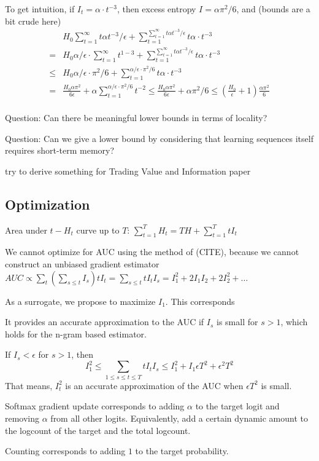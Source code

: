\documentclass[11pt,letterpaper]{article}
\begin{document}
To get intuition, if $I_t = \alpha \cdot t^{-3}$, then excess entropy $I=\alpha \pi^2/6$, and (bounds are a bit crude here)
\begin{align}
& H_0 \sum_{t=1}^\infty t \alpha t^{-3}/\epsilon + \sum_{t=1}^{\sum_{t=1}^\infty t \alpha t^{-3}/\epsilon} t \alpha \cdot t^{-3} \\
= & H_0 \alpha/\epsilon \cdot \sum_{t=1}^\infty  t^{1-3} + \sum_{t=1}^{\sum_{t=1}^\infty t \alpha t^{-3}/\epsilon} t \alpha \cdot t^{-3} \\
\leq & H_0 \alpha/\epsilon \cdot \pi^2/6 + \sum_{t=1}^{\alpha/\epsilon \cdot \pi^2/6} t \alpha \cdot t^{-3} \\
= & \frac{H_0 \alpha \pi^2}{6 \epsilon} + \alpha \sum_{t=1}^{\alpha/\epsilon \cdot \pi^2/6}  t^{-2} \leq  \frac{H_0 \alpha \pi^2}{6 \epsilon} + \alpha \pi^2/6  \leq  \left(\frac{H_0}{\epsilon} + 1\right) \frac{\alpha \pi^2}{6} \\
\end{align}


Question: Can there be meaningful lower bounds in terms of locality?

Question: Can we give a lower bound by considering that learning sequences itself requires short-term memory?

try to derive something for Trading Value and Information paper


\subsection{Optimization}
Area under $t - H_t$ curve up to $T$: $\sum_{t=1}^T H_t = T H + \sum_{t=1}^T t I_t$

We cannot optimize for AUC using the method of (CITE), because we cannot construct an unbiased gradient estimator
$AUC \propto \sum_{t} (\sum_{s \leq t} I_s) tI_t = \sum_{s \leq t}  tI_t I_s = I_1^2 + 2 I_1 I_2 + 2 I_2^2 + \dots$



As a surrogate, we propose to maximize $I_1$.
This corresponds

It provides an accurate approximation to the AUC if $I_s$ is small for $s > 1$, which holds for the n-gram based estimator.

If $I_s < \epsilon$ for $s > 1$, then 
\begin{equation}
	I_1^2 \leq \sum_{1\leq s \leq t \leq T}  tI_t I_s \leq I_1^2 + I_1 \epsilon T^2 + \epsilon^2 T^2
\end{equation}
That means, $I_t^2$ is an accurate approximation of the AUC when $\epsilon T^2$ is small.


Softmax gradient update corresponds to adding $\alpha$ to the target logit and removing $\alpha$ from all other logits.
Equivalently, add a certain dynamic amount to the logcount of the target and the total logcount.



Counting corresponds to adding $1$ to the target probability. 







\end{document}
